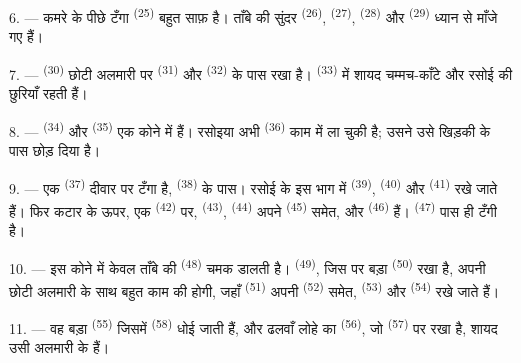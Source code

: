 \VUsaut{4.0mm}
\VUsaut{3.0mm}

6. --- कमरे के पीछे टँगा  \textsuperscript{(25)} बहुत साफ़
है। ताँबे की सुंदर  \textsuperscript{(26)}, 
\textsuperscript{(27)},  \textsuperscript{(28)} और 
\textsuperscript{(29)} ध्यान से माँजे गए हैं।

7. ---  \textsuperscript{(30)} छोटी अलमारी पर 
\textsuperscript{(31)} और  \textsuperscript{(32)} के पास
रखा है।  \textsuperscript{(33)} में शायद चम्मच-काँटे और रसोई की
छुरियाँ रहती हैं।

8. ---  \textsuperscript{(34)} और 
\textsuperscript{(35)} एक कोने में हैं। रसोइया अभी 
\textsuperscript{(36)} काम में ला चुकी है; उसने उसे खिड़की के पास छोड़ दिया है।

9. --- एक  \textsuperscript{(37)} दीवार पर टँगा है,
 \textsuperscript{(38)} के पास। रसोई के इस भाग में 
\textsuperscript{(39)},  \textsuperscript{(40)} और
 \textsuperscript{(41)} रखे जाते हैं। फिर कटार के ऊपर, एक
 \textsuperscript{(42)} पर,  \textsuperscript{(43)},
 \textsuperscript{(44)} अपने 
\textsuperscript{(45)} समेत, और  \textsuperscript{(46)} हैं।
 \textsuperscript{(47)} पास ही टँगी है।

10. --- इस कोने में केवल ताँबे की  \textsuperscript{(48)} चमक डालती
है।  \textsuperscript{(49)}, जिस पर बड़ा 
\textsuperscript{(50)} रखा है, अपनी छोटी अलमारी के साथ बहुत काम की होगी, जहाँ
 \textsuperscript{(51)} अपनी 
\textsuperscript{(52)} समेत,  \textsuperscript{(53)} और
 \textsuperscript{(54)} रखे जाते हैं।

\VUsaut{4.0mm}
\VUsaut{3.0mm}

11. --- वह बड़ा  \textsuperscript{(55)} जिसमें 
\textsuperscript{(58)} धोई जाती हैं, और ढलवाँ लोहे का  \textsuperscript{(56)},
जो  \textsuperscript{(57)} पर रखा है, शायद उसी अलमारी के
हैं।

